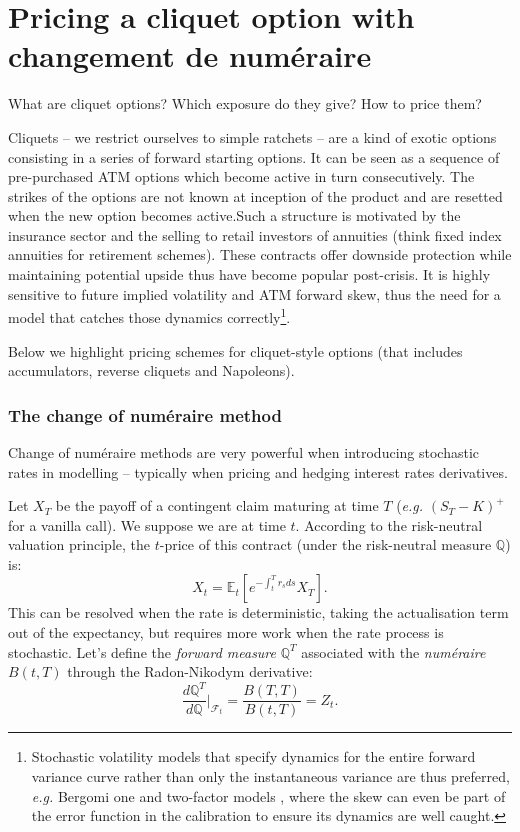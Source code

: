 \section{Pricing a cliquet option with changement de num\'eraire}

\begin{tcolorbox}[width=\linewidth, sharp corners=all, colback=white!95!black]
What are cliquet options? Which exposure do they give? How to price them?
\end{tcolorbox}

Cliquets -- we restrict ourselves to simple ratchets -- are a kind of exotic options consisting in a series of forward starting options. It can be seen as a sequence of pre-purchased ATM options which become active in turn consecutively. The strikes of the options are not known at inception of the product and are resetted when the new option becomes active.\newline Such a structure is motivated by the insurance sector and the selling to retail investors of annuities (think fixed index annuities for retirement schemes). These contracts offer downside protection while maintaining potential upside thus have become popular post-crisis. \newline It is highly sensitive to future implied volatility and ATM forward skew, thus the need for a model that catches those dynamics correctly\footnote{Stochastic volatility models that specify dynamics for the entire forward variance curve rather than only the instantaneous variance are thus preferred, \textit{e.g.} Bergomi one and two-factor models \cite{bergomi2004smile, bergomi2005smile}, where the skew can even be part of the error function in the calibration to ensure its dynamics are well caught.}.

Below we highlight pricing schemes for cliquet-style options (that includes accumulators, reverse cliquets and Napoleons).

\subsubsection*{The change of num\'eraire method}

Change of num\'eraire methods are very powerful when introducing stochastic rates in modelling -- typically when pricing and hedging interest rates derivatives.

Let $X_T$ be the payoff of a contingent claim maturing at time $T$ (\textit{e.g.} $(S_T-K)^{+}$ for a vanilla call). We suppose we are at time $t$. 
According to the risk-neutral valuation principle, the $t$-price of this contract (under the risk-neutral measure $\mathbb{Q}$) is: \[X_t = \mathbb{E}_t\left[e^{-\int_t^T r_s ds} X_T\right].\]
This can be resolved when the rate is deterministic, taking the actualisation term out of the expectancy, but requires more work when the rate process is stochastic. \newline Let's define the \textit{forward measure} $\mathbb{Q}^{T}$ associated with the \textit{num\'eraire} $B(t,T)$ through the Radon-Nikodym derivative: \[\dfrac{d\mathbb{Q}^{T}}{d \mathbb{Q}}\bigg|_{\mathcal{F}_t} = \dfrac{B(T,T)}{B(t,T)} = Z_t.\]%


